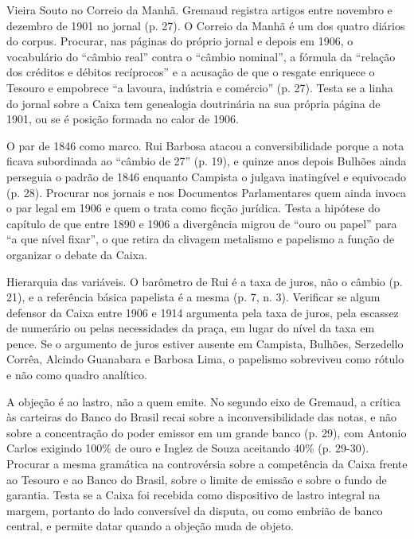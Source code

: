 \begin{dialogo}
\item Vieira Souto no Correio da Manhã. Gremaud registra artigos entre novembro
e dezembro de 1901 no jornal (p. 27). O Correio da Manhã é um dos quatro
diários do corpus. Procurar, nas páginas do próprio jornal e depois em 1906,
o vocabulário do ``câmbio real'' contra o ``câmbio nominal'', a fórmula da
``relação dos créditos e débitos recíprocos'' e a acusação de que o resgate
enriquece o Tesouro e empobrece ``a lavoura, indústria e comércio'' (p. 27).
Testa se a linha do jornal sobre a Caixa tem genealogia doutrinária na sua
própria página de 1901, ou se é posição formada no calor de 1906.

\item O par de 1846 como marco. Rui Barbosa atacou a conversibilidade porque a
nota ficava subordinada ao ``câmbio de 27'' (p. 19), e quinze anos depois
Bulhões ainda perseguia o padrão de 1846 enquanto Campista o julgava
inatingível e equivocado (p. 28). Procurar nos jornais e nos Documentos
Parlamentares quem ainda invoca o par legal em 1906 e quem o trata como ficção
jurídica. Testa a hipótese do capítulo de que entre 1890 e 1906 a divergência
migrou de ``ouro ou papel'' para ``a que nível fixar'', o que retira da
clivagem metalismo e papelismo a função de organizar o debate da Caixa.

\item Hierarquia das variáveis. O barômetro de Rui é a taxa de juros, não o
câmbio (p. 21), e a referência básica papelista é a mesma (p. 7, n. 3).
Verificar se algum defensor da Caixa entre 1906 e 1914 argumenta pela taxa de
juros, pela escassez de numerário ou pelas necessidades da praça, em lugar do
nível da taxa em pence. Se o argumento de juros estiver ausente em Campista,
Bulhões, Serzedello Corrêa, Alcindo Guanabara e Barbosa Lima, o papelismo
sobreviveu como rótulo e não como quadro analítico.

\item A objeção é ao lastro, não a quem emite. No segundo eixo de Gremaud, a
crítica às carteiras do Banco do Brasil recai sobre a inconversibilidade das
notas, e não sobre a concentração do poder emissor em um grande banco (p. 29),
com Antonio Carlos exigindo 100\% de ouro e Inglez de Souza aceitando 40\%
(p. 29-30). Procurar a mesma gramática na controvérsia sobre a competência da
Caixa frente ao Tesouro e ao Banco do Brasil, sobre o limite de emissão e sobre
o fundo de garantia. Testa se a Caixa foi recebida como dispositivo de lastro
integral na margem, portanto do lado conversível da disputa, ou como embrião de
banco central, e permite datar quando a objeção muda de objeto.


\end{dialogo}
